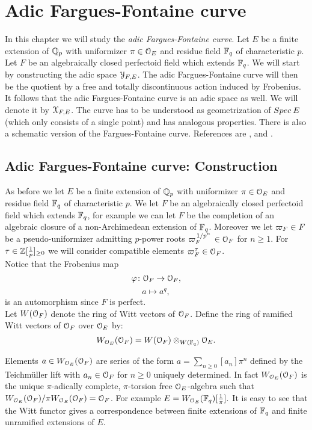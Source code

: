 \chapter{Adic Fargues-Fontaine curve}

In this chapter we will study the \emph{adic Fargues-Fontaine curve}.
Let $E$ be a finite extension of $\mathbb{Q}_p$ with uniformizer $\pi\in\mathcal{O}_E$ and residue field $\mathbb{F}_q$ of characteristic $p$.
Let $F$ be an algebraically closed perfectoid field which extends $\mathbb{F}_q$.
We will start by constructing  the adic space $\mathcal{Y}_{F,E}$. 
The adic Fargues-Fontaine curve will then be the quotient by a free and totally discontinuous action induced by Frobenius.
It follows that the adic Fargues-Fontaine curve is an adic space as well. We will denote it by $\mathcal{X}_{F,E}$. The curve has to be understood as geometrization of ${Spec{\:E}}$ (which only consists of a single point) and has analogous properties. There is also a schematic version of the Fargues-Fontaine curve.
References are \cite{FS2021}, \cite{FF11} and \cite{SW20}.

\section{Adic Fargues-Fontaine curve: Construction}
As before we let $E$ be a finite extension of $\mathbb{Q}_p$ with uniformizer $\pi\in\mathcal{O}_E$ and residue field $\mathbb{F}_q$ of characteristic $p$.
We let $F$ be an algebraically closed perfectoid field which extends $\mathbb{F}_q$, for example we can let $F$ be the completion of an algebraic closure of a non-Archimedean extension of $\mathbb{F}_q$.
Moreover we let $\varpi_F\in F$ be a pseudo-uniformizer admitting $p$-power roots $\varpi_F^{\left.1\middle/p^n\right.}\in \mathcal{O}_F$ for $n\geq1$.
For $\tau\in{\mathbb{Z}[\tfrac{1}{p}]_{\geq0}}$ we will consider compatible elements $\varpi_F^\tau\in \mathcal{O}_F$.\\

Notice that the Frobenius map
\[\varphi\colon \mathcal{O}_F\to \mathcal{O}_F,\]
\[a\mapsto a^q,\]
is an automorphism since $F$ is perfect.\\

Let $W(\mathcal{O}_F)$ denote the ring of Witt vectors of $\mathcal{O}_F$.
Define the ring of ramified Witt vectors of $\mathcal{O}_F$ over $\mathcal{O}_E$ by:
\[W_{\mathcal{O}_E}(\mathcal{O}_F) = W(\mathcal{O}_F)\otimes_{W(\mathbb{F}_q)}\mathcal{O}_{E}.\]

Elements $a\in W_{\mathcal{O}_E}(\mathcal{O}_F)$ are series of the form $a=\sum_{n\geq0}[a_n]\pi^n$ defined by the Teichmüller lift with $a_n\in\mathcal{O}_F$ for $n\geq 0$ uniquely determined. In fact $W_{\mathcal{O}_E}(\mathcal{O}_F)$ is the unique $\pi$-adically complete, $\pi$-torsion free
$\mathcal{O}_E$-algebra such that $W_{\mathcal{O}_E}(\mathcal{O}_F)/\pi W_{\mathcal{O}_E}(\mathcal{O}_F) = \mathcal{O}_F$. For example $E=W_{\mathcal{O}_E}(\mathbb{F}_q)[\tfrac{1}{\pi}].$ It is easy to see that the Witt functor gives a correspondence between finite extensions of $\mathbb{F}_q$ and finite unramified extensions of $E$.\\

